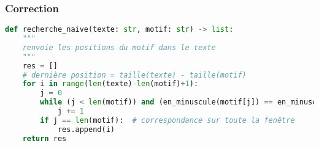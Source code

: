 \documentclass[svgnames,11pt]{beamer}
\begin{document}
\begin{frame}[fragile]
    \frametitle{Correction}

\begin{center}
\begin{lstlisting}[language=Python , basicstyle=\small, xleftmargin=2em, xrightmargin=2em]
def recherche_naive(texte: str, motif: str) -> list:
    """
    renvoie les positions du motif dans le texte
    """
    res = []
    # dernière position = taille(texte) - taille(motif)
    for i in range(len(texte)-len(motif)+1):
        j = 0
        while (j < len(motif)) and (en_minuscule(motif[j]) == en_minuscule(texte[i+j])):
            j += 1       
        if j == len(motif):  # correspondance sur toute la fenêtre
            res.append(i)
    return res
\end{lstlisting}
\end{center}

\end{frame}
\end{document}
